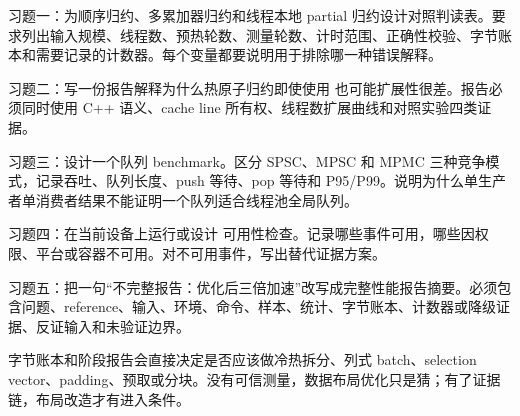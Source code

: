 \begin{exercisebox}
习题一：为顺序归约、多累加器归约和线程本地 partial 归约设计对照判读表。要求列出输入规模、线程数、预热轮数、测量轮数、计时范围、正确性校验、字节账本和需要记录的计数器。每个变量都要说明用于排除哪一种错误解释。

习题二：写一份报告解释为什么热原子归约即使使用  也可能扩展性很差。报告必须同时使用 C++ 语义、cache line 所有权、线程数扩展曲线和对照实验四类证据。

习题三：设计一个队列 benchmark。区分 SPSC、MPSC 和 MPMC 三种竞争模式，记录吞吐、队列长度、push 等待、pop 等待和 P95/P99。说明为什么单生产者单消费者结果不能证明一个队列适合线程池全局队列。

习题四：在当前设备上运行或设计  可用性检查。记录哪些事件可用，哪些因权限、平台或容器不可用。对不可用事件，写出替代证据方案。

习题五：把一句“不完整报告：优化后三倍加速”改写成完整性能报告摘要。必须包含问题、reference、输入、环境、命令、样本、统计、字节账本、计数器或降级证据、反证输入和未验证边界。
\end{exercisebox}

字节账本和阶段报告会直接决定是否应该做冷热拆分、列式 batch、selection vector、padding、预取或分块。没有可信测量，数据布局优化只是猜；有了证据链，布局改造才有进入条件。
